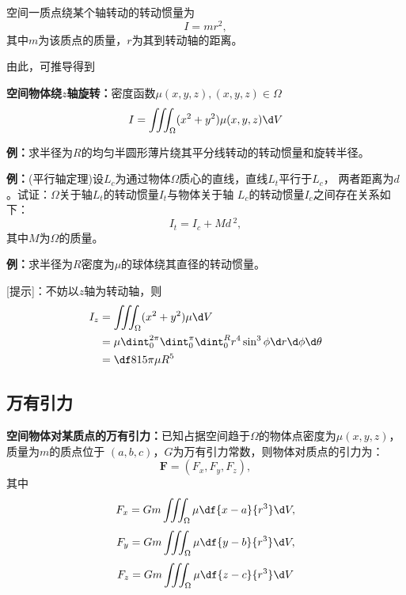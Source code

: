 空间一质点绕某个轴转动的转动惯量为
$${I=mr^2},$$
其中$m$为该质点的质量，$r$为其到转动轴的距离。
\begin{center}
\end{center}
由此，可推导得到
\begin{thx}
	{\bf 空间物体绕$z$轴旋转：}密度函数$\mu(x,y,z),(x,y,z)\in\Omega$
	$${I=\iiint_{\Omega}(x^2+y^2)\mu(x,y,z)\d V}$$
\end{thx}

{\bf 例：}求半径为$R$的均匀半圆形薄片绕其平分线转动的转动惯量和旋转半径。

{\bf 例：}{\kaishu (平行轴定理)}设$L_c$为通过物体$\Omega$质心的直线，直线$L_t$平行于$L_c$，
两者距离为$d$。试证：$\Omega$关于轴$L_t$的转动惯量$I_t$与物体关于轴
$L_c$的转动惯量$I_c$之间存在关系如下：
$$I_t=I_c+Md\,^2,$$
其中$M$为$\Omega$的质量。

{\bf 例：}求半径为$R$密度为$\mu$的球体绕其直径的转动惯量。

[提示]：不妨以$z$轴为转动轴，则
\begin{align*}
	I_z&=\iiint_{\Omega}(x^2+y^2)\mu\d V\\
	&=\mu\dint_0^{2\pi}\dint_0^{\pi}\dint_0^Rr^4\sin^3\phi\d r
	\d\phi\d\theta\\
	&=\df8{15}\pi\mu R^5
\end{align*}

\subsection{万有引力}

\begin{thx}
	{\bf 空间物体对某质点的万有引力：}已知占据空间趋于$\Omega$的物体点密度为$\mu(x,y,z)$，质量为$m$的质点位于
	$(a,b,c)$，$G$为万有引力常数，则物体对质点的引力为：
	$$\bm{F}=(F_x,F_y,F_z),$$
	其中
	$${F_x=Gm\iiint_{\Omega}\mu\df{x-a}{r^3}\d V,} $$
	$${F_y=Gm\iiint_{\Omega}\mu\df{y-b}{r^3}\d V,} $$
	$${F_z=Gm\iiint_{\Omega}\mu\df{z-c}{r^3}\d V} $$
\end{thx}

